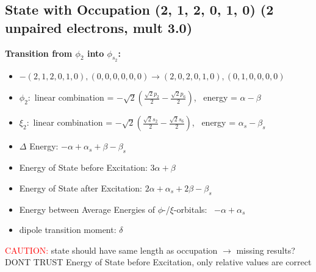 \documentclass[12pt,a4paper]{article}
\begin{document}
\subsection*{State with Occupation (2, 1, 2, 0, 1, 0) (2 unpaired electrons, mult 3.0)}
        \noindent\textbf{Transition from $\phi_{2}$ into $\phi_{s_{2}}$:}
        \begin{itemize}
            \item $- (2, 1, 2, 0, 1, 0), (0, 0, 0, 0, 0, 0) \rightarrow (2, 0, 2, 0, 1, 0), (0, 1, 0, 0, 0, 0)$
        
            \item $\phi_{2}:$ linear combination = $- \sqrt{2} \left(\frac{\sqrt{2} p_{2}}{2} - \frac{\sqrt{2} p_{6}}{2}\right)$, \
            energy = $\alpha - \beta$
            
            \item $\xi_{2}:$ linear combination = $- \sqrt{2} \left(\frac{\sqrt{2} s_{2}}{2} - \frac{\sqrt{2} s_{6}}{2}\right)$, \
            energy = $\alpha_{s} - \beta_{s}$
            
            \item $\Delta$ Energy: $- \alpha + \alpha_{s} + \beta - \beta_{s}$
            \item Energy of State before Excitation: $3 \alpha + \beta$
            \item Energy of State after Excitation: $2 \alpha + \alpha_{s} + 2 \beta - \beta_{s}$
            \item Energy between Average Energies of $\phi$-/$\xi$-orbitals: \
            $- \alpha + \alpha_{s}$
        
            \item dipole transition moment: $\delta$
        
        \end{itemize}
        
	\textcolor{red}{CAUTION:} state should have same length as occupation $\rightarrow$ missing results?
	DONT TRUST \glqq{}Energy of State before Excitation\grqq{}, only relative values are correct
\end{document}
